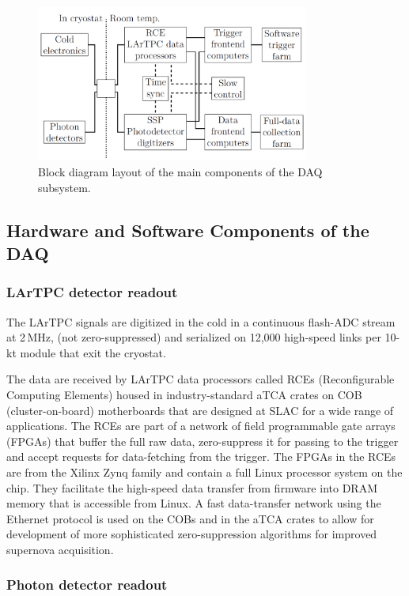 \begin{figure}[h!]
	\centering
	\includegraphics[width=0.8\textwidth]{daq-block-diagram.png}
	\caption{Block diagram layout of the main components of the DAQ subsystem.}
	\label{fig:fddaqblock}
\end{figure}


\subsection{Hardware and Software Components of the DAQ}
\subsubsection{LArTPC detector readout}

The LArTPC signals are digitized in the cold in a continuous flash-ADC stream at 2\,MHz, (not zero-suppressed)
and serialized on 12,000 high-speed links per 10-kt module that exit the cryostat.

The data are received by LArTPC data processors called RCEs (Reconfigurable
Computing Elements) housed in industry-standard aTCA crates on COB (cluster-on-board)
motherboards that are designed at SLAC for a wide range of applications.  The RCEs are part of a
network of field programmable gate arrays (FPGAs) that buffer the full raw data,
zero-suppress it for passing to the trigger and accept requests for
data-fetching from the trigger.  The FPGAs in the RCEs are from the
Xilinx Zynq family and contain a full Linux processor system on the
chip.  They facilitate the high-speed data transfer from firmware into
DRAM memory that is accessible from Linux.  A fast data-transfer
network using the Ethernet protocol is used on the COBs and in the
aTCA crates to allow for development of more sophisticated zero-suppression algorithms
for improved supernova acquisition.

\subsubsection{Photon detector readout}

